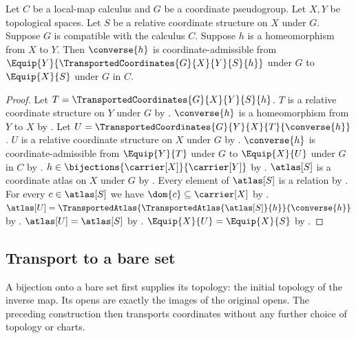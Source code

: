\begin{theorem}\label{transported_coordinates_inverse_admissible}
    Let $C$ be a local-map calculus and $G$ be a coordinate pseudogroup.
    Let $X,Y$ be topological spaces.
    Let $S$ be a relative coordinate structure on $X$ under $G$.
    Suppose $G$ is compatible with the calculus $C$.
    Suppose $h$ is a homeomorphism from $X$ to $Y$.
    Then $\converse{h}$ is coordinate-admissible from
        $\Equip{Y}{\TransportedCoordinates{G}{X}{Y}{S}{h}}$ under $G$
        to $\Equip{X}{S}$ under $G$ in $C$.
\end{theorem}
\begin{proof}
    Let $T=\TransportedCoordinates{G}{X}{Y}{S}{h}$.
    $T$ is a relative coordinate structure on $Y$ under $G$ by .
    $\converse{h}$ is a homeomorphism from $Y$ to $X$ by .
    Let $U=\TransportedCoordinates{G}{Y}{X}{T}{\converse{h}}$.
    $U$ is a relative coordinate structure on $X$ under $G$ by .
    $\converse{h}$ is coordinate-admissible from $\Equip{Y}{T}$ under $G$
        to $\Equip{X}{U}$ under $G$ in $C$ by .
    $h\in\bijections{\carrier[X]}{\carrier[Y]}$ by .
    $\atlas[S]$ is a coordinate atlas on $X$ under $G$ by
        .
    Every element of $\atlas[S]$ is a relation by
        .
    For every $c\in\atlas[S]$ we have $\dom{c}\subseteq\carrier[X]$ by
        .
    $\atlas[U]=\TransportedAtlas{\TransportedAtlas{\atlas[S]}{h}}{\converse{h}}$ by
        .
    $\atlas[U]=\atlas[S]$ by .
    $\Equip{X}{U}=\Equip{X}{S}$ by .
\end{proof}

\subsection{Transport to a bare set}

A bijection onto a bare set first supplies its topology: the initial topology
of the inverse map. Its opens are exactly the images of the original opens.
The preceding construction then transports coordinates without any further
choice of topology or charts.

